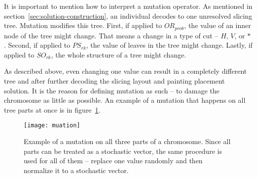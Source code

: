 It is important to mention how to interpret a mutation operator.
As mentioned in section~\ref{sec:solution-construction}, an individual decodes to one unresolved slicing tree.
Mutation modifies this tree.
First, if applied to $OR_{prob}$, the value of an inner node of the tree might change.
That means a change in a type of cut – $H$, $V$, or $*$.
Second, if applied to $PS_{rk}$, the value of leaves in the tree might change.
Lastly, if applied to $SO_{rk}$, the whole structure of a tree might change.

As described above, even changing one value can result in a completely different tree and
after further decoding the slicing layout and painting placement solution.
It is the reason for defining mutation as such – to damage the chromosome as little as possible.
An example of a mutation that happens on all tree parts at once is in figure~\ref{fig:mutation}.


\begin{figure}[!h]
    \texttt{[image: muation]}
    \caption[Example of a mutation on all three parts of a chromosome]{
        Example of a mutation on all three parts of a chromosome.
        Since all parts can be treated as a stochastic vector, the same procedure
        is used for all of them – replace one value randomly and then normalize it to a stochastic vector.
    }
    \label{fig:mutation}
\end{figure}
